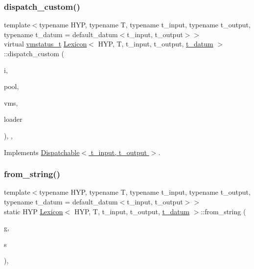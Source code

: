 \subsubsection{\texorpdfstring{dispatch\+\_\+custom()}{dispatch\_custom()}}
{\footnotesize\ttfamily template$<$typename H\+YP, typename T, typename t\+\_\+input, typename t\+\_\+output, typename t\+\_\+datum = default\+\_\+datum$<$t\+\_\+input, t\+\_\+output$>$$>$ \\
virtual \hyperlink{_instruction_8h_a6202215407ab29590bb936ca2996cf64}{vmstatus\+\_\+t} \hyperlink{class_lexicon}{Lexicon}$<$ H\+YP, T, t\+\_\+input, t\+\_\+output, \hyperlink{class_bayesable_a7c93a2eeab708378eb321745908718d4}{t\+\_\+datum} $>$\+::dispatch\+\_\+custom (\begin{DoxyParamCaption}\item[{\hyperlink{class_instruction}{Instruction}}]{i,  }\item[{\hyperlink{class_virtual_machine_pool}{Virtual\+Machine\+Pool}$<$ t\+\_\+input, t\+\_\+output $>$ $\ast$}]{pool,  }\item[{\hyperlink{class_virtual_machine_state}{Virtual\+Machine\+State}$<$ t\+\_\+input, t\+\_\+output $>$ $\ast$}]{vms,  }\item[{\hyperlink{class_dispatchable}{Dispatchable}$<$ t\+\_\+input, t\+\_\+output $>$ $\ast$}]{loader }\end{DoxyParamCaption})\hspace{0.3cm}{\ttfamily [inline]}, {\ttfamily [override]}, {\ttfamily [virtual]}}



Implements \hyperlink{class_dispatchable_a6d2bd844b0e55378d29ed85e718d0a77}{Dispatchable$<$ t\+\_\+input, t\+\_\+output $>$}.

\mbox{\label{class_lexicon_a1a78d0be4350165b5757201b411f94f8}} 
\subsubsection{\texorpdfstring{from\+\_\+string()}{from\_string()}}
{\footnotesize\ttfamily template$<$typename H\+YP, typename T, typename t\+\_\+input, typename t\+\_\+output, typename t\+\_\+datum = default\+\_\+datum$<$t\+\_\+input, t\+\_\+output$>$$>$ \\
static H\+YP \hyperlink{class_lexicon}{Lexicon}$<$ H\+YP, T, t\+\_\+input, t\+\_\+output, \hyperlink{class_bayesable_a7c93a2eeab708378eb321745908718d4}{t\+\_\+datum} $>$\+::from\+\_\+string (\begin{DoxyParamCaption}\item[{\hyperlink{class_grammar}{Grammar} \&}]{g,  }\item[{std\+::string}]{s }\end{DoxyParamCaption})\hspace{0.3cm}{\ttfamily [inline]}, {\ttfamily [static]}}

